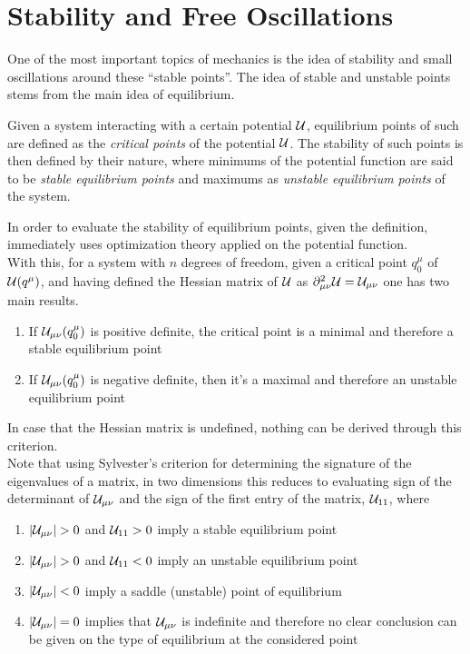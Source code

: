 \documentclass[../admech.tex]{subfiles}
\begin{document}
\section{Stability and Free Oscillations}
One of the most important topics of mechanics is the idea of stability and small oscillations around these ``stable points''. The idea of stable and unstable points stems from the main idea of equilibrium.
\begin{dfn}
	Given a system interacting with a certain potential $\mathcal{U}$, equilibrium points of such are defined as the \emph{critical points} of the potential $\mathcal{U}$. The stability of such points is then defined by their nature, where minimums of the potential function are said to be \emph{stable equilibrium points} and maximums as \emph{unstable equilibrium points} of the system.
\end{dfn}
In order to evaluate the stability of equilibrium points, given the definition, immediately uses optimization theory applied on the potential function.\\
With this, for a system with $n$ degrees of freedom, given a critical point $q^\mu_0$ of $\mathcal{U}(q^\mu)$, and having defined the Hessian matrix of $\mathcal{U}$ as $\partial^2_{\mu\nu}\mathcal{U}=\mathcal{U}_{\mu\nu}$ one has two main results.
\begin{enumerate}
\item If $\mathcal{U}_{\mu\nu}(q^\mu_0)$ is positive definite, the critical point is a minimal and therefore a stable equilibrium point
\item If $\mathcal{U}_{\mu\nu}(q^\mu_0)$ is negative definite, then it's a maximal and therefore an unstable equilibrium point
\end{enumerate}
In case that the Hessian matrix is undefined, nothing can be derived through this criterion.\\
Note that using Sylvester's criterion for determining the signature of the eigenvalues of a matrix, in two dimensions this reduces to evaluating sign of the determinant of $\mathcal{U}_{\mu\nu}$ and the sign of the first entry of the matrix, $\mathcal{U}_{11}$, where
\begin{enumerate}
\item $\abs{\mathcal{U}_{\mu\nu}}>0$ and $\mathcal{U}_{11}>0$ imply a stable equilibrium point
\item $\abs{\mathcal{U}_{\mu\nu}}>0$ and $\mathcal{U}_{11}<0$ imply an unstable equilibrium point
\item $\abs{\mathcal{U}_{\mu\nu}}<0$ imply a saddle (unstable) point of equilibrium
\item $\abs{\mathcal{U}_{\mu\nu}}=0$ implies that $\mathcal{U}_{\mu\nu}$ is indefinite and therefore no clear conclusion can be given on the type of equilibrium at the considered point
\end{enumerate}
\end{document}
